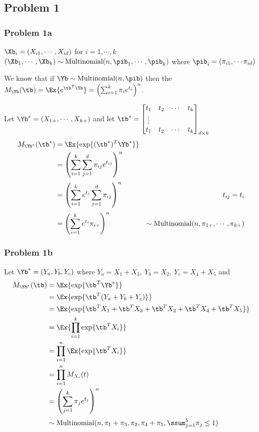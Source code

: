 \documentclass[12pt, letterpaper]{article}
\begin{document}
\subsection*{Problem 1}
\subsubsection*{Problem 1a}
$\Xb_i = (X_{i1}, \cdots, X_{id})$  for $i = 1, \cdots, k$\\
$(\Xb_1, \cdots, \Xb_k) \sim \text{Multinomial}(n, \pib_1, \cdots, \pib_k)$ where $\pib_i = (\pi_{i1}, \cdots \pi_{id})$

We know that if $\Yb \sim \text{Multinomial}(n, \pib)$ then the $M_{\Yb}(\tb) = \Ex{ e^{\tb^T \Yb}} = \left( \sum_{i=1}^k \pi_i e^{t_i} \right)^n$.  

Let $\Yb^* = (X_{1+}, \cdots, X_{k+})$ and let  $\tb^* = \begin{bmatrix} 
t_1 & t_2 & \cdots& t_k \\
\vdots & & & \\
t_1 & t_2 & \cdots& t_k 
\end{bmatrix}_{d \times k}$ 
\begin{align*}
M_{\Yb^*}(\tb^*) & = \Ex{ \exp\{(\tb^*)^T \Yb^*\}}
\\
& =  \left( \sum_{i=1}^k \sum_{j=1}^d \pi_{ij} e^{t_{ij}} \right)^n 
\\[0.5ex]
& = \left( \sum_{i=1}^k e^{t_i} \sum_{j=1}^d \pi_{ij} \right)^n & t_{ij} = t_i 
\\[0.5ex]
& = \left( \sum_{i=1}^k e^{t_i} \pi_{i+} \right)^n & \sim \text{Multinomial}(n, \pi_{1+}, \cdots, \pi_{k+})
\end{align*}

\newpage 
\subsubsection*{Problem 1b}
Let $\Yb^* = (Y_a, Y_b, Y_c)$ where $Y_a = X_1 + X_3, \ Y_b = X_2, \ Y_c = X_4 + X_5$ and 
\begin{align*}
M_{\Yb^*}(\tb) & = \Ex{ \exp\{ \tb^T \Yb^* \}}
\\
& = \Ex{ \exp \{ \tb^T(Y_a + Y_b + Y_c)	\}}
\\
& = \Ex{ \exp \{ \tb^T X_1 + \tb^T X_3 + \tb^T X_2 + \tb^T X_4 + \tb^T X_5 \}}
\\
& = \Ex{ \prod_{i=1}^k \exp \{ \tb^T X_i \} } 
\\
& = \prod_{i=1}^n \Ex{ \exp \{ \tb^T X_i \}}
\\
& = \prod_{i=1}^n M_{X_i}(t) 
\\
& = \left( \sum_{j=1}^k \pi_j e^{t_j} \right)^n 
\\[0.5ex]
& \sim \text{Multinomial}(n, \pi_1 + \pi_3, \pi_2, \pi_4 + \pi_5, \ssum_{j=1}^5 \pi_j \leq 1)
\end{align*}
\end{document}
